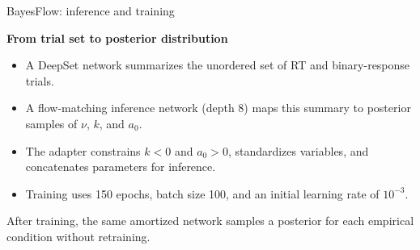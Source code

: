 \documentclass[aspectratio=43,10pt]{beamer}
\newcommand{\greenheading}[1]{%
  {\color{TUGreen}\fontsize{12}{14}\selectfont\bfseries #1\par}%
}
\begin{document}
\begin{frame}{BayesFlow: inference and training}
  \vspace{0.08cm}
  \greenheading{From trial set to posterior distribution}
  \begin{itemize}
    \item A DeepSet network summarizes the unordered set of RT and binary-response trials.
    \item A flow-matching inference network (depth 8) maps this summary to posterior samples of $\nu$, $k$, and $a_0$.
    \item The adapter constrains $k<0$ and $a_0>0$, standardizes variables, and concatenates parameters for inference.
    \item Training uses 150 epochs, batch size 100, and an initial learning rate of $10^{-3}$.
  \end{itemize}

  \vspace{0.38cm}
  {\color{TUMuted}\fontsize{10}{12}\selectfont
  After training, the same amortized network samples a posterior for each empirical condition without retraining.}
\end{frame}
\end{document}
